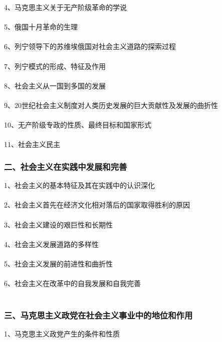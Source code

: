 \documentclass{ctexart}
\begin{document}
4、马克思主义关于无产阶级革命的学说
\\\\

5、俄国十月革命的生理
\\\\

6、列宁领导下的苏维埃俄国对社会主义道路的探索过程
\\\\

7、列宁模式的形成、特征及作用
\\\\

8、社会主义从一国到多国的发展
\\\\

9、20世纪社会主义制度对人类历史发展的巨大贡献性及发展的曲折性
\\\\

10、无产阶级专政的性质、最终目标和国家形式
\\\\

11、社会主义民主
\subsubsection{二、社会主义在实践中发展和完善}
1、社会主义的基本特征及其在实践中的认识深化
\\\\

2、社会主义首先在经济文化相对落后的国家取得胜利的原因
\\\\

3、社会主义建设的艰巨性和长期性
\\\\

4、社会主义发展道路的多样性
\\\\

5、社会主义发展的前进性和曲折性
\\\\

6、社会主义在改革中的自我发展和自我完善
\\\\

\subsubsection{三、马克思主义政党在社会主义事业中的地位和作用}
1、马克思主义政党产生的条件和性质
\\\\
\end{document}
